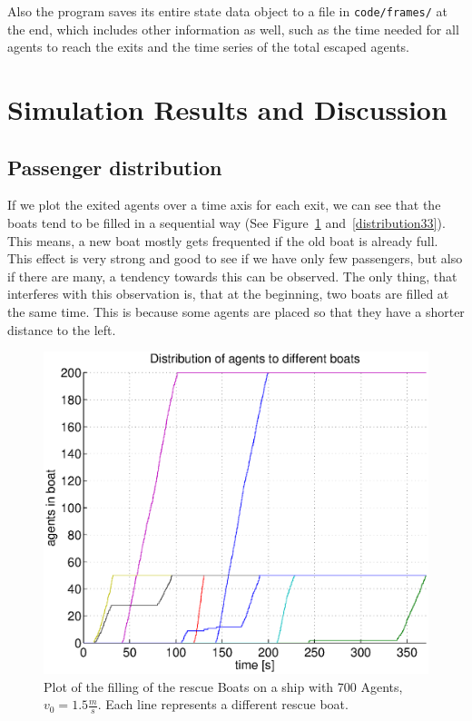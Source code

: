\documentclass[11pt]{article}
\begin{document}
Also the program saves its entire state data object to a file in
\texttt{code/frames/} at the end, which includes other information as well,
such as the time needed for all agents to reach the exits and the time series
of the total escaped agents.

\section{Simulation Results and Discussion}

\subsection{Passenger distribution} %

If we plot the exited agents over a time axis for each exit, we can see that
the boats tend to be filled in a sequential way (See Figure~\ref{distribution11} and~\ref{distribution33}).
This means, a new boat mostly
gets frequented if the old boat is already full.  This effect is very strong
and good to see if we have only few passengers, but also if there are many, a
tendency towards this can be observed. The only thing, that interferes with this 
observation is, that at the beginning, two boats are filled at the same time.
This is because some agents are placed so that they have a shorter distance to the left.

\begin{figure}[h]
	\centering
	\includegraphics[scale=0.5]{images/distribution11.eps}
	\caption{Plot of the filling of the rescue Boats on a ship with 700 Agents, \(v_0=1.5\frac{m}{s}\).
	Each line represents a different rescue boat.}
	\label{distribution11}
\end{figure}
\end{document}

